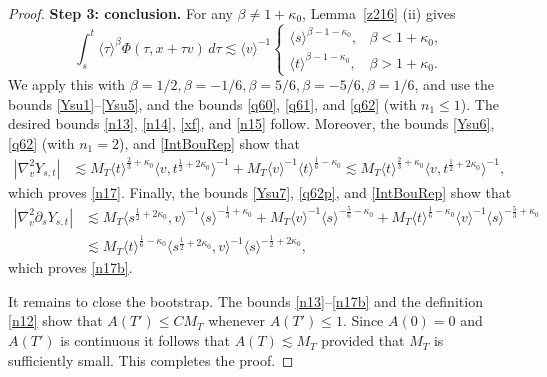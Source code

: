 \documentclass[10pt,a4paper]{amsart}
\theoremstyle{plain}
\begin{document}
\begin{proof}
	
	\textbf{Step 3: conclusion.}
	For any $\beta\neq1+\kappa_0$, Lemma~\ref{z216} (ii) gives
	\begin{equation}\label{IntBouRep}
		\int_s^t
		\langle\tau\rangle^\beta
		\Phi(\tau,x+\tau v)\,d\tau
		\lesssim
		\langle v\rangle^{-1}
		\begin{cases}
			\langle s\rangle^{\beta-1-\kappa_0},
			&\beta<1+\kappa_0,\\
			\langle t\rangle^{\beta-1-\kappa_0},
			&\beta>1+\kappa_0.
		\end{cases}
	\end{equation}
	We apply this with $\beta=1/2, \beta=-1/6, \beta=5/6, \beta=-5/6, \beta=1/6$, and use the bounds \eqref{Ysu1}--\eqref{Ysu5}, and the bounds \eqref{q60}, \eqref{q61}, and \eqref{q62} (with $n_1\leq 1$). The desired bounds \eqref{n13}, \eqref{n14}, \eqref{xf}, and \eqref{n15} follow. Moreover, the bounds \eqref{Ysu6}, \eqref{q62} (with $n_1=2$), and \eqref{IntBouRep} show that
	\begin{align*}
		|\nabla_v^2Y_{s,t}|&\lesssim
		M_T\langle t\rangle^{\frac23+\kappa_0}
		\langle v,t^{\frac12+2\kappa_0}\rangle^{-1}+M_T\langle v\rangle^{-1}
		\langle t\rangle^{\frac16-\kappa_0}\lesssim
		M_T\langle t\rangle^{\frac23+\kappa_0}
		\langle v,t^{\frac12+2\kappa_0}\rangle^{-1},
	\end{align*}
	which proves \eqref{n17}. Finally, the bounds \eqref{Ysu7}, \eqref{q62p}, and \eqref{IntBouRep} show that
	\begin{align*}
		|\nabla_v^2\partial_sY_{s,t}|&\lesssim M_T\langle s^{\frac12+2\kappa_0},v\rangle^{-1}
		\langle s\rangle^{-\frac13+\kappa_0}+M_T\langle v\rangle^{-1}
		\langle s\rangle^{-\frac56-\kappa_0}+ M_T\langle t\rangle^{\frac16-\kappa_0}\langle v\rangle^{-1}\langle s\rangle^{-\frac53+\kappa_0}\\
		&\lesssim
		M_T\langle t\rangle^{\frac16-\kappa_0}
		\langle s^{\frac12+2\kappa_0},v\rangle^{-1}
		\langle s\rangle^{-\frac12+2\kappa_0},
	\end{align*}
	which proves \eqref{n17b}.
	
	It remains to close the bootstrap. The bounds \eqref{n13}--\eqref{n17b} and the definition \eqref{n12} show that \(A(T')\leq C M_T\) whenever \(A(T')\leq1\). Since $A(0)=0$ and $A(T')$ is continuous it follows that $A(T)\lesssim M_T$ provided that $M_T$ is sufficiently small. This completes the proof.
\end{proof}
\end{document}
